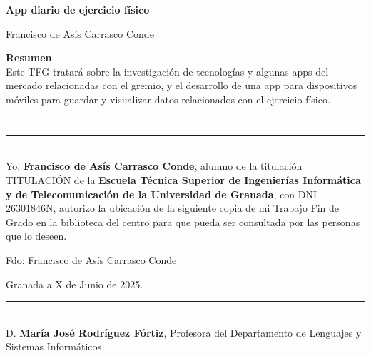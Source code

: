 \thispagestyle{empty}

\begin{center}
{\large\bfseries App diario de ejercicio físico}\\
\end{center}
\begin{center}
Francisco de Asís Carrasco Conde\\
\end{center}

\vspace{0.7cm}

\noindent\textbf{Resumen}\\  
	
Este TFG tratará sobre la investigación de tecnologías y algunas apps del mercado relacionadas con el gremio, y el desarrollo de una app para dispositivos móviles para guardar y visualizar datos relacionados con el ejercicio físico.

\chapter*{}
\thispagestyle{empty}

\noindent\rule[-1ex]{\textwidth}{2pt}\\[4.5ex]

Yo, \textbf{Francisco de Asís Carrasco Conde}, alumno de la titulación TITULACIÓN de la \textbf{Escuela Técnica Superior
de Ingenierías Informática y de Telecomunicación de la Universidad de Granada}, con DNI 26301846N, autorizo la
ubicación de la siguiente copia de mi Trabajo Fin de Grado en la biblioteca del centro para que pueda ser
consultada por las personas que lo deseen.

\vspace{6cm}

\noindent Fdo: Francisco de Asís Carrasco Conde

\vspace{2cm}

\begin{flushright}
Granada a X de Junio de 2025.
\end{flushright}

\thispagestyle{empty}

\noindent\rule[-1ex]{\textwidth}{2pt}\\[4.5ex]

D. \textbf{María José Rodríguez Fórtiz}, Profesora del Departamento de Lenguajes y Sistemas Informáticos

\vspace{0.5cm}

